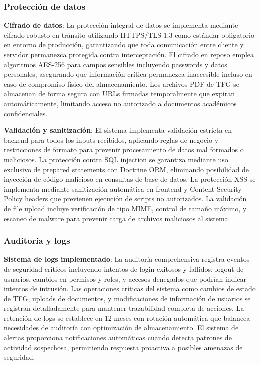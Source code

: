\documentclass[12pt,a4paper,oneside]{report}
\begin{document}
\subsubsection{Protección de datos}\label{protecciuxf3n-de-datos}

\textbf{Cifrado de datos}: La protección integral de datos se implementa mediante cifrado robusto en tránsito utilizando HTTPS/TLS 1.3 como estándar obligatorio en entorno de producción, garantizando que toda comunicación entre cliente y servidor permanezca protegida contra interceptación. El cifrado en reposo emplea algoritmos AES-256 para campos sensibles incluyendo passwords y datos personales, asegurando que información crítica permanezca inaccesible incluso en caso de compromiso físico del almacenamiento. Los archivos PDF de TFG se almacenan de forma segura con URLs firmadas temporalmente que expiran automáticamente, limitando acceso no autorizado a documentos académicos confidenciales.

\textbf{Validación y sanitización}: El sistema implementa validación estricta en backend para todos los inputs recibidos, aplicando reglas de negocio y restricciones de formato para prevenir procesamiento de datos mal formados o maliciosos. La protección contra SQL injection se garantiza mediante uso exclusivo de prepared statements con Doctrine ORM, eliminando posibilidad de inyección de código malicioso en consultas de base de datos. La protección XSS se implementa mediante sanitización automática en frontend y Content Security Policy headers que previenen ejecución de scripts no autorizados. La validación de file upload incluye verificación de tipo MIME, control de tamaño máximo, y escaneo de malware para prevenir carga de archivos maliciosos al sistema.

\subsubsection{Auditoría y logs}\label{auditoruxeda-y-logs}

\textbf{Sistema de logs implementado}: La auditoría comprehensiva registra eventos de seguridad críticos incluyendo intentos de login exitosos y fallidos, logout de usuarios, cambios en permisos y roles, y accesos denegados que podrían indicar intentos de intrusión. Las operaciones críticas del sistema como cambios de estado de TFG, uploads de documentos, y modificaciones de información de usuarios se registran detalladamente para mantener trazabilidad completa de acciones. La retención de logs se establece en 12 meses con rotación automática que balancea necesidades de auditoría con optimización de almacenamiento. El sistema de alertas proporciona notificaciones automáticas cuando detecta patrones de actividad sospechosa, permitiendo respuesta proactiva a posibles amenazas de seguridad.
\end{document}
